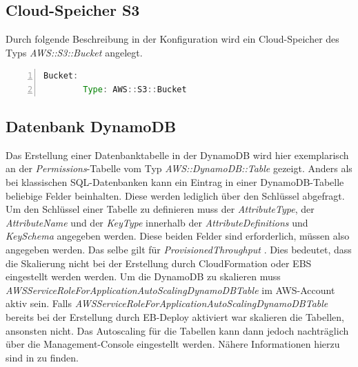 \documentclass[a4paper, 12pt]{scrreprt}
\renewcommand\_{\textunderscore\allowbreak}
\begin{document}
\subsection{Cloud-Speicher S3}
Durch folgende Beschreibung in der Konfiguration wird ein Cloud-Speicher des Typs \textit{AWS::S3::Bucket} angelegt.
\begin{lstlisting}[xleftmargin=\parindent,numbers=left,numberstyle=\small,numbersep=8pt,frame=L,mathescape=true, basicstyle=\small, language=Java, lineskip={1.0pt}]
Bucket:
        Type: AWS::S3::Bucket
\end{lstlisting}          


\subsection{Datenbank DynamoDB}
Das Erstellung einer Datenbanktabelle in der DynamoDB wird hier exemplarisch an der \textit{Permissions}-Tabelle vom Typ \textit{AWS::DynamoDB::Table} gezeigt. Anders als bei klassischen SQL-Datenbanken kann ein Eintrag in einer DynamoDB-Tabelle beliebige Felder beinhalten. Diese werden lediglich über den Schlüssel abgefragt. Um den Schlüssel einer Tabelle zu definieren muss der \textit{AttributeType}, der \textit{AttributeName} und der \textit{KeyType} innerhalb der \textit{AttributeDefinitions} und \textit{KeySchema} angegeben werden. Diese beiden Felder sind erforderlich, müssen also angegeben werden. Das selbe gilt für \textit{ProvisionedThroughput} \cite{AWSDa}.
Dies bedeutet, dass die Skalierung nicht bei der Erstellung durch CloudFormation oder EBS eingestellt werden werden. Um die DynamoDB zu skalieren muss \textit{AWSServiceRoleForApplicationAutoScaling\_DynamoDBTable} im AWS-Account aktiv sein. Falls \textit{AWSServiceRoleForApplicationAutoScaling\_DynamoDBTable} bereits bei der Erstellung durch EB-Deploy aktiviert war skalieren die Tabellen,  ansonsten nicht. Das Autoscaling für die Tabellen kann dann jedoch nachträglich über die Management-Console eingestellt werden. Nähere Informationen hierzu sind in \cite{AWSDb} zu finden.



\end{document}
